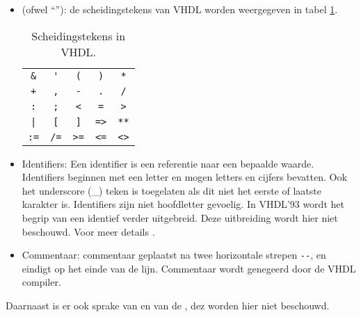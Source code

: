 \begin{itemize}
\begin{itemize}
 \end{itemize}
 \item {} (ofwel ``''): de
scheidingstekens van VHDL worden weergegeven in tabel \ref{tbl:vHDLdelimiters}.
\begin{table}[hbt]
\centering
\begin{tabular}{ccccc}
\verb+&+&\verb+'+&\verb+(+&\verb+)+&\verb+*+\\
\verb/+/&\verb+,+&\verb+-+&\verb+.+&\verb+/+\\
\verb+:+&\verb+;+&\verb+<+&\verb+=+&\verb+>+\\
\verb+|+&\verb+[+&\verb+]+&\verb+=>+&\verb+**+\\
\verb+:=+&\verb+/=+&\verb+>=+&\verb+<=+&\verb+<>+
\end{tabular}
\caption{Scheidingstekens in VHDL.}
\label{tbl:vHDLdelimiters}
\end{table}
 \item Identifiers: Een identifier is een referentie naar een bepaalde waarde. Identifiers beginnen met een letter en mogen letters en cijfers bevatten. Ook het underscore (\_) teken is toegelaten als dit niet het eerste of laatste karakter is. Identifiers zijn niet hoofdletter gevoelig. In VHDL'93 wordt het begrip van een identief verder uitgebreid. Deze uitbreiding wordt hier niet beschouwd. Voor meer details \cite[p. 4]{hardi00}.
 \item Commentaar: commentaar geplaatst na twee horizontale strepen \verb+--+, en eindigt op het einde van de lijn. Commentaar wordt genegeerd door de VHDL compiler.
\end{itemize}
Daarnaast is er ook sprake van  en van de , dez worden hier niet beschouwd.
